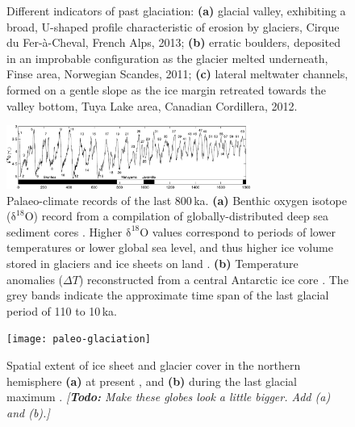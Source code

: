 \documentclass{article}
\newcommand{\todo}[1]{\emph{[\textbf{Todo:} #1]}}
\newcommand{\chem}[1]{\ensuremath{\mathrm{#1}}}
\newcommand{\subgraphics}[3][,]{%
  \setbox1=\hbox{\texttt{[image: \#3]}}%
  \leavevmode\rlap{\usebox1}%
  \rlap{\hspace*{0.25em}
        \raisebox{\dimexpr\ht1-3ex}{\textbf{(#2)}}}%
  \phantom{\usebox1}%
}
\begin{document}
\begin{figure}
  \centering
  \makebox[0pt]{
    \subgraphics{a}{photo-glacial-valley}
    \hspace{1cm}
    \subgraphics{b}{photo-erratic-boulder}
    \hspace{1cm}
    \subgraphics{c}{photo-melt-channels}
  }
  \caption{Different indicators of past glaciation:
           \textbf{(a)} glacial valley, exhibiting a broad, U-shaped profile
           characteristic of erosion by glaciers,
           Cirque du Fer-\`{a}-Cheval, French Alps, 2013;
           \textbf{(b)} erratic boulders, deposited in an improbable
           configuration as the glacier melted underneath,
           Finse area, Norwegian Scandes, 2011;
           \textbf{(c)} lateral meltwater channels, formed on a gentle slope
           as the ice margin retreated towards the valley bottom, Tuya Lake
           area, Canadian Cordillera, 2012.}
  \label{fig:glaciation-indicators}
\end{figure}

\begin{figure}
  \centering
  \includegraphics[width=80mm]{paleo-timeseries}
  \caption{Palaeo-climate records of the last 800\,ka.
           \textbf{(a)} Benthic oxygen isotope (\chem{\delta^{18}O}) record
           from a compilation of globally-distributed deep sea sediment cores
           \citep{Lisiecki.Raymo.2005}. Higher \chem{\delta^{18}O} values
           correspond to periods of lower temperatures \citep{Emiliani.1955}
           or lower global sea level, and thus higher ice volume stored in
           glaciers and ice sheets on land \citep{Shackleton.1967}.
           \textbf{(b)} Temperature anomalies ($\Delta T$) reconstructed from a
           central Antarctic ice core \citep[EPICA Dome~C,][]{Jouzel.etal.2007}.
           The grey bands indicate the approximate time span of the last
           glacial period of 110 to 10\,ka.}
  \label{fig:paleo-timeseries}
\end{figure}

\begin{figure}
  \centering
  \texttt{[image: paleo-glaciation]}
  \caption{Spatial extent of ice sheet and glacier cover in the northern
           hemisphere \textbf{(a)} at present \citep{Patterson.Kelso.2014}, and
           \textbf{(b)} during the last glacial maximum
           \citep{Ehlers.Gibbard.2007}.
           \todo{Make these globes look a little bigger. Add (a) and (b).}}
  \label{fig:paleo-glaciation}
\end{figure}
\end{document}
